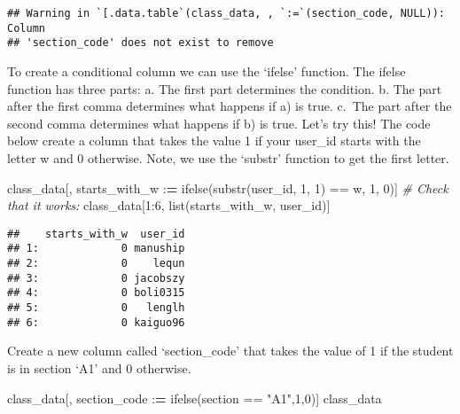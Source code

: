 \documentclass[
]{article}
\newenvironment{Shaded}{\begin{snugshade}}{\end{snugshade}}
\newcommand{\CommentTok}[1]{\textcolor[rgb]{0.56,0.35,0.01}{\textit{#1}}}
\newcommand{\DecValTok}[1]{\textcolor[rgb]{0.00,0.00,0.81}{#1}}
\newcommand{\ErrorTok}[1]{\textcolor[rgb]{0.64,0.00,0.00}{\textbf{#1}}}
\newcommand{\FunctionTok}[1]{\textcolor[rgb]{0.00,0.00,0.00}{#1}}
\newcommand{\NormalTok}[1]{#1}
\newcommand{\SpecialCharTok}[1]{\textcolor[rgb]{0.00,0.00,0.00}{#1}}
\newcommand{\StringTok}[1]{\textcolor[rgb]{0.31,0.60,0.02}{#1}}
\begin{document}
\begin{verbatim}
## Warning in `[.data.table`(class_data, , `:=`(section_code, NULL)): Column
## 'section_code' does not exist to remove
\end{verbatim}

To create a conditional column we can use the `ifelse' function. The
ifelse function has three parts: a. The first part determines the
condition. b. The part after the first comma determines what happens if
a) is true. c.~The part after the second comma determines what happens
if b) is true. Let's try this! The code below create a column that takes
the value 1 if your user\_id starts with the letter w and 0 otherwise.
Note, we use the `substr' function to get the first letter.

\begin{Shaded}
\begin{Highlighting}[]
\NormalTok{class\_data[, starts\_with\_w }\SpecialCharTok{:}\ErrorTok{=} \FunctionTok{ifelse}\NormalTok{(}\FunctionTok{substr}\NormalTok{(user\_id, }\DecValTok{1}\NormalTok{, }\DecValTok{1}\NormalTok{)  }\SpecialCharTok{==} \StringTok{\textquotesingle{}w\textquotesingle{}}\NormalTok{, }\DecValTok{1}\NormalTok{, }\DecValTok{0}\NormalTok{)]}
\CommentTok{\# Check that it works:}
\NormalTok{class\_data[}\DecValTok{1}\SpecialCharTok{:}\DecValTok{6}\NormalTok{, }\FunctionTok{list}\NormalTok{(starts\_with\_w, user\_id)]}
\end{Highlighting}
\end{Shaded}

\begin{verbatim}
##    starts_with_w  user_id
## 1:             0 manuship
## 2:             0    lequn
## 3:             0 jacobszy
## 4:             0 boli0315
## 5:             0   lenglh
## 6:             0 kaiguo96
\end{verbatim}

Create a new column called `section\_code' that takes the value of 1 if
the student is in section `A1' and 0 otherwise.

\begin{Shaded}
\begin{Highlighting}[]
\NormalTok{class\_data[, section\_code }\SpecialCharTok{:}\ErrorTok{=} \FunctionTok{ifelse}\NormalTok{(section }\SpecialCharTok{==} \StringTok{"A1"}\NormalTok{,}\DecValTok{1}\NormalTok{,}\DecValTok{0}\NormalTok{)]}
\NormalTok{class\_data}
\end{Highlighting}
\end{Shaded}
\end{document}
